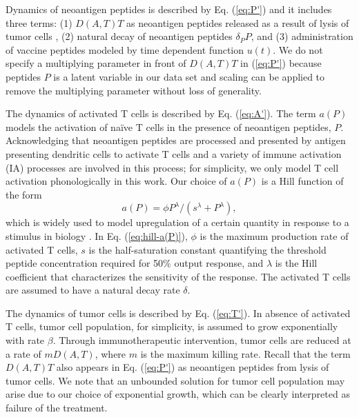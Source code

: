 \documentclass[review,authoryear]{elsarticle}
\begin{document}
Dynamics of neoantigen peptides is described by Eq. (\ref{eq:P'}) and it includes three terms: (1) $D(A,T)T$ as neoantigen peptides released as a result of lysis of tumor cells \citep{Konstorum2017}, (2) natural decay of neoantigen peptides $\delta_P P$, and (3) administration of vaccine peptides modeled by time dependent function $u(t)$. We do not specify a multiplying parameter in front of $D(A,T)T$ in
(\ref{eq:P'}) because peptides $P$ is a latent variable in our data set and scaling
can be applied to remove the multiplying parameter without loss of
generality.  

The dynamics of activated T cells is described by Eq. (\ref{eq:A'}). The term $a(P)$ models the activation of na\"ive T cells in the presence of neoantigen peptides, $P$. Acknowledging that neoantigen peptides are processed and presented by antigen presenting dendritic cells to activate T cells and a variety of immune activation (IA) processes are involved in this process; for simplicity, we only model T cell activation phonologically in this work. Our choice of $a(P)$ is a Hill function of the form   
\begin{equation} \label{eq:hill-a(P)}
a(P)=\phi P^{\lambda}/(s^{\lambda}+P^{\lambda}), 
\end{equation}
which is widely used to model upregulation of a certain quantity in response to a stimulus in biology \citep{Somvanshi2013}. In Eq. (\ref{eq:hill-a(P)}), $\phi$ is the maximum production rate of activated T cells, $s$ is the half-saturation constant quantifying the threshold peptide concentration required for 50\% output response, and $\lambda$ is the Hill coefficient that characterizes the sensitivity of the response. The activated T cells are assumed to have a natural decay rate $\delta$.

The dynamics of tumor cells is described by Eq. (\ref{eq:T'}). In absence of activated T cells, tumor cell population, for simplicity, is assumed to grow exponentially with rate $\beta$. Through immunotherapeutic intervention, tumor cells are reduced at a rate of $mD(A,T)$, where $m$ is the maximum killing rate. Recall that the term $D(A,T)T$ also appears in Eq. (\ref{eq:P'}) as neoantigen peptides from lysis of tumor cells. We note that an unbounded solution for tumor cell population may arise due to our choice of exponential growth, which can be clearly interpreted as failure of the treatment. 
\end{document}
